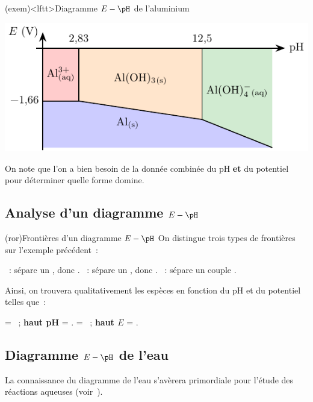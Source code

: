 \documentclass[a4paper, 10pt, landscape, twocolumn]{book}
\begin{document}
\begin{tcb*}(exem)<lftt>{Diagramme $E-\pH$ de l'aluminium}
	\begin{center}
		\includegraphics[scale=1.5]{eph_al}
	\end{center}
	On note que l'on a bien besoin de la donnée combinée du pH \textbf{et} du
	potentiel pour déterminer quelle forme domine.
\end{tcb*}

\subsection{Analyse d'un diagramme $E-\pH$}
\begin{tcb*}[breakable](ror){Frontières d'un diagramme $E-\pH$}
	On distingue trois types de frontières sur l'exemple précédent~:
	\begin{itemize}
		~: sépare un , donc .
		~: sépare un , donc .
		~: sépare un couple .
	\end{itemize}
	Ainsi, on trouvera qualitativement les espèces en fonction du pH et du
	potentiel telles que~:
	\begin{itemize}
		 = ~; \textbf{haut pH} = \xul{\psw{base}}.
		 = ~; \textbf{haut $E$} =
		\xul{\psw{oxydant}}.
	\end{itemize}
\end{tcb*}

\subsection{Diagramme $E-\pH$ de l'eau}
La connaissance du diagramme de l'eau s'avèrera primordiale pour l'étude des
réactions aqueuses (voir~).
\end{document}
